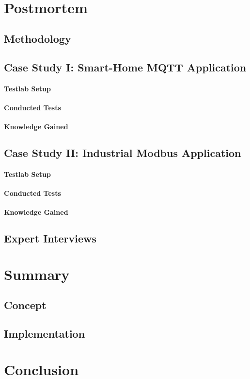 \chapter{Postmortem}
\section{Methodology}
\section{Case Study I: Smart-Home MQTT Application}
\subsubsection{Testlab Setup}
\subsubsection{Conducted Tests}
\subsubsection{Knowledge Gained}
\section{Case Study II: Industrial Modbus Application}
\subsubsection{Testlab Setup}
\subsubsection{Conducted Tests}
\subsubsection{Knowledge Gained}
\section{Expert Interviews}

\chapter{Summary}
\section{Concept}
\section{Implementation}

\chapter{Conclusion}

